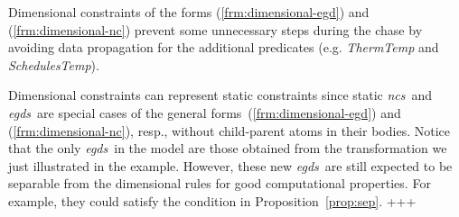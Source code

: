\documentclass[format=acmsmall, review=false, screen=true]{acmart}
\newcommand{\egds}{{\em egds}}
\newcommand{\ncs}{{\em ncs}}
\newcommand{\red}[1]{{#1}}
\begin{document}
{Dimensional constraints of the forms (\ref{frm:dimensional-egd}) and (\ref{frm:dimensional-nc}) prevent some unnecessary steps during the chase by avoiding data propagation for the additional predicates (e.g. {\it ThermTemp} and {\it SchedulesTemp}).

\red{Dimensional constraints can represent static constraints since static \ncs \ and \egds \ are special cases of the general forms~(\ref{frm:dimensional-egd}) and (\ref{frm:dimensional-nc}), resp., without child-parent atoms in their bodies. Notice that the only \egds \ in the model are those obtained from the transformation we just illustrated in the example. However, these new \egds \ are still expected to be separable from the dimensional rules for good computational properties. For example, they could satisfy the condition in Proposition~\ref{prop:sep}.}
+++}
\end{document}
